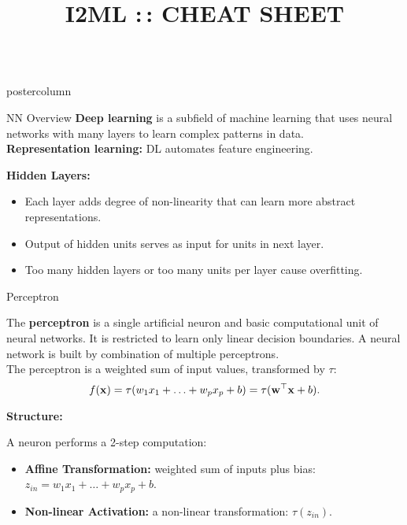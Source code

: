 \documentclass{beamer}
\title{I2ML :\,: CHEAT SHEET} %
\newlength{\columnheight} %
\begin{document}
\begin{frame}[fragile]{}
\begin{columns}
	\begin{column}{.31\textwidth}
		\begin{beamercolorbox}[center]{postercolumn}
			\begin{minipage}{.98\textwidth}
				\parbox[t][\columnheight]{\textwidth}{

					\begin{myblock}{NN Overview}
      \textbf{Deep learning} is a subfield of machine learning that uses neural networks with many layers to learn complex patterns in data.\\
      \textbf{Representation learning:} DL automates feature engineering.
      \begin{codebox} 
        \textbf{Hidden Layers:}
        \end{codebox}
      \begin{itemize}[$\bullet$] 
        \setlength{\itemindent}{+.3in}
          \item Each layer adds degree of non-linearity that can learn more abstract representations.
          \item Output of hidden units serves as input for units in next layer.
          \item Too many hidden layers or too many units per layer cause overfitting.
      \end{itemize}

\end{myblock}


\begin{myblock}{Perceptron}

The \textbf{perceptron} is a single artificial neuron and basic computational unit of neural networks.
It is restricted to learn only linear decision boundaries.
A neural network is built by combination of multiple perceptrons.\\
The perceptron is a weighted sum of input values, transformed by $\tau$:
$$f(\mathbf{x})=\tau(w_1x_1+\ldots+w_px_p+b)=\tau(\mathbf{w}^\top\mathbf{x}+b).$$

\begin{codebox} 
  \textbf{Structure:}
  \end{codebox}
A neuron performs a 2-step computation:
\begin{itemize}[$\bullet$] 
  \setlength{\itemindent}{+.3in}
  \item \textbf{Affine Transformation:} weighted sum of inputs plus bias: $z_{in}=w_1x_1+\ldots+w_px_p+b$.
  \item \textbf{Non-linear Activation:} a non-linear transformation: $\tau(z_{in})$.
\end{itemize}


\end{myblock}}
\end{minipage}
\end{beamercolorbox}
\end{column}
\end{columns}
\end{frame}
\end{document}
